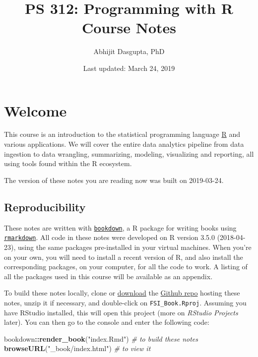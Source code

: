 \documentclass[12pt,letterpaperpaper,openany]{book}
\title{PS 312: Programming with R\\
Course Notes}
\author{Abhijit Dasgupta, PhD}
\date{Last updated: March 24, 2019}
\newenvironment{Shaded}{\begin{snugshade}}{\end{snugshade}}
\newcommand{\CommentTok}[1]{\textcolor[rgb]{0.56,0.35,0.01}{\textit{#1}}}
\newcommand{\KeywordTok}[1]{\textcolor[rgb]{0.13,0.29,0.53}{\textbf{#1}}}
\newcommand{\NormalTok}[1]{#1}
\newcommand{\OperatorTok}[1]{\textcolor[rgb]{0.81,0.36,0.00}{\textbf{#1}}}
\newcommand{\StringTok}[1]{\textcolor[rgb]{0.31,0.60,0.02}{#1}}
\begin{document}
\maketitle

\hypertarget{welcome}{%
\chapter*{Welcome}\label{welcome}}

This course is an introduction to the statistical programming language
\href{http://www.r-project.org}{R} and various applications. We will cover the entire data analytics pipeline from data ingestion to data wrangling, summarizing, modeling, visualizing and reporting, all using tools found within the R ecosystem.

The version of these notes you are reading now was built on
2019-03-24.

\hypertarget{reproducibility}{%
\section*{Reproducibility}\label{reproducibility}}

These notes are written with \href{https://bookdown.org}{\texttt{bookdown}}, a R package for writing books using \href{https://rmarkdown.rstudio.com}{\texttt{rmarkdown}}.
All code in these notes were developed on R version 3.5.0 (2018-04-23), using
the same packages pre-installed in your virtual machines. When you're on your
own, you will need to install a recent version of R, and also install the
corresponding packages, on your computer, for all the code to work. A listing of
all the packages used in this course will be available as an appendix.

To build these notes locally, clone or \href{https://github.com/araastat/FSI_Book/archive/master.zip}{download} the
\href{https://github.com/araastat/FSI_Book}{Github repo} hosting these notes, unzip it if necessary, and double-click on \texttt{FSI\_Book.Rproj}. Assuming you have RStudio installed, this will open this project (more on \emph{RStudio Projects} later). You can then go to the console and enter the following code:

\begin{Shaded}
\begin{Highlighting}[]
\NormalTok{bookdown}\OperatorTok{::}\KeywordTok{render_book}\NormalTok{(}\StringTok{"index.Rmd"}\NormalTok{) }\CommentTok{# to build these notes}
\KeywordTok{browseURL}\NormalTok{(}\StringTok{"_book/index.html"}\NormalTok{) }\CommentTok{# to view it}
\end{Highlighting}
\end{Shaded}
\end{document}
